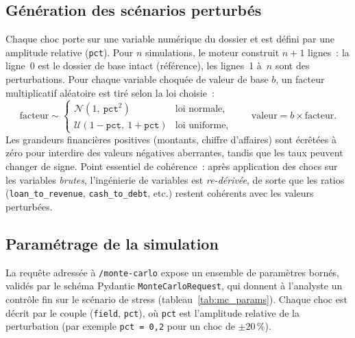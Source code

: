 \documentclass[a4paper,12pt,oneside]{report}
\begin{document}
\subsection{Génération des scénarios perturbés}

Chaque choc porte sur une variable numérique du dossier et est défini par une amplitude
relative (\texttt{pct}). Pour $n$ simulations, le moteur construit $n+1$ lignes~: la ligne~0
est le dossier de base intact (référence), les lignes~1 à~$n$ sont des perturbations. Pour
chaque variable choquée de valeur de base $b$, un facteur multiplicatif aléatoire est tiré selon
la loi choisie~:
\[
\text{facteur} \sim
\begin{cases}
\mathcal{N}(1,\ \texttt{pct}^2) & \text{loi normale,}\\
\mathcal{U}(1-\texttt{pct},\ 1+\texttt{pct}) & \text{loi uniforme,}
\end{cases}
\qquad
\text{valeur} = b \times \text{facteur}.
\]
Les grandeurs financières positives (montants, chiffre d'affaires) sont écrêtées à zéro pour
interdire des valeurs négatives aberrantes, tandis que les taux peuvent changer de signe. Point
essentiel de cohérence~: après application des chocs sur les variables \emph{brutes},
l'ingénierie de variables est \emph{re-dérivée}, de sorte que les ratios
(\texttt{loan\_to\_revenue}, \texttt{cash\_to\_debt}, etc.) restent cohérents avec les valeurs
perturbées.

\subsection{Paramétrage de la simulation}

La requête adressée à \texttt{/monte-carlo} expose un ensemble de paramètres bornés, validés par
le schéma Pydantic \texttt{MonteCarloRequest}, qui donnent à l'analyste un contrôle fin sur le
scénario de stress (tableau~\ref{tab:mc_params}). Chaque choc est décrit par le couple
(\texttt{field}, \texttt{pct}), où \texttt{pct} est l'amplitude relative de la perturbation
(par exemple \texttt{pct~=~0{,}2} pour un choc de $\pm 20\,\%$).
\end{document}
